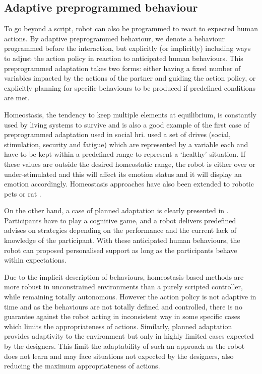 \subsection{Adaptive preprogrammed behaviour}
	
	To go beyond a script, robot can also be programmed to react to expected human actions. By adaptive preprogrammed behaviour, we denote a behaviour programmed before the interaction, but explicitly (or implicitly) including ways to adjust the action policy in reaction to anticipated human behaviours. This preprogrammed adaptation takes two forms: either having a fixed number of variables impacted by the actions of the partner and guiding the action policy, or explicitly planning for specific behaviours to be produced if predefined conditions are met.
	
	
	Homeostasis, the tendency to keep multiple elements at equilibrium, is constantly used by living systems to survive and is also a good example of the first case of preprogrammed adaptation used in social \gls{hri}. \citet{breazeal1998motivational} used a set of drives (social, stimulation, security and fatigue) which are represented by a variable each and have to be kept within a predefined range to represent a `healthy' situation. If these values are outside the desired homeostatic range, the robot is either over or under-stimulated and this will affect its emotion status and it will display an emotion accordingly. Homeostasis approaches have also been extended to robotic pets \citep{arkin2003ethological} or \gls{rat} \citep{cao2017collaborative}.
	
	On the other hand, a case of planned adaptation is clearly presented in \citet{leyzberg2014personalizing}. Participants have to play a cognitive game,  and a robot delivers predefined advises on strategies depending on the performance and the current lack of knowledge of the participant. With these anticipated human behaviours, the robot can proposed personalised support as long as the participants behave within expectations. 

	
	Due to the implicit description of behaviours, homeostasis-based methods are more robust in unconstrained environments than a purely scripted controller, while remaining totally autonomous. However the action policy is not adaptive in time and as the behaviours are not totally defined and controlled, there is no guarantee against the robot acting in inconsistent way in some specific cases which limits the appropriateness of actions. Similarly, planned adaptation provides adaptivity to the environment but only in highly limited cases expected by the designers. This limit the adaptability of such an approach as the robot does not learn and may face situations not expected by the designers, also reducing the maximum appropriateness of actions.

